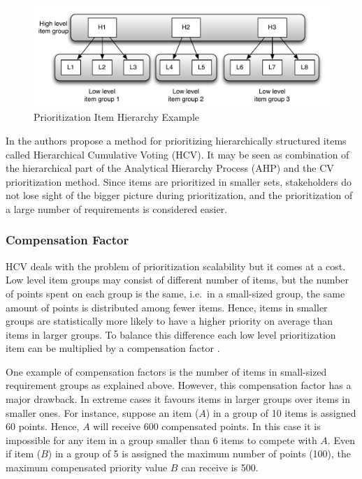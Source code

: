 %
\begin{figure}
	\center
\includegraphics[scale=0.45]{fig/hcv-example1}

\caption{\label{fig:Prionitization-Item-Hierarchy}Prioritization Item Hierarchy
Example}
%
\end{figure}


In \citep{Berander2006a} the authors propose a method for prioritizing hierarchically
structured items called Hierarchical Cumulative Voting (HCV). It may
be seen as combination of the hierarchical part of the Analytical Hierarchy
Process (AHP) \citep{Berander2005,Saaty1980a} and the CV prioritization method.
Since items are prioritized in smaller sets, stakeholders do not lose
sight of the bigger picture during prioritization, and the prioritization of a large number
of requirements is considered easier.%


\subsubsection{Compensation Factor\label{sub:Compensation-factor}}

HCV deals with the problem of prioritization scalability but it comes
at a cost. Low level item groups may consist of different number of
items, but the number of points spent on each group is the same, i.e.\ in
a small-sized group, the same amount of points is distributed among fewer items.
Hence, items in smaller groups are statistically more likely to have a higher priority on average
than items in larger groups. To balance this difference each low
level prioritization item can be multiplied by a compensation factor \citep{Berander2006a}.


One example of compensation factors is the number of items in small-sized
requirement groups as explained above. However, this compensation factor
has a major drawback. In extreme cases it favours items in larger groups
over items in smaller ones. For instance, suppose an item ($A$) in a
group of 10 items is assigned 60 points. Hence, $A$ will receive 600
compensated points. In this case it is impossible for any item in
a group smaller than 6 items to compete with $A$. Even if item ($B$) in
a group of 5 is assigned the maximum number of points (100), the maximum compensated
priority value $B$ can receive is 500.

